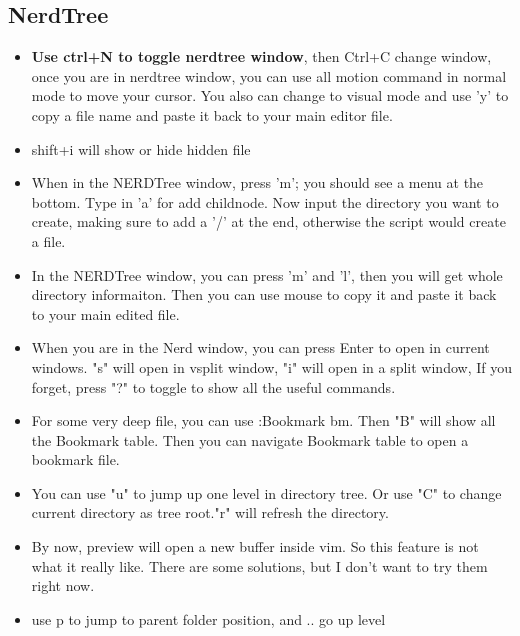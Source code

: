 \documentclass[a4paper,12pt,twoside]{book}
\begin{document}
\subsection{NerdTree}
\begin{itemize}
		
		\item \textbf{Use ctrl+N to toggle nerdtree window}, then Ctrl+C change window, once you are in nerdtree window, you can use all motion command in normal mode to move your cursor. You also can change to visual mode and use 'y' to copy a file name and paste it back to your main editor file.  

		\item shift+i will show or hide hidden file
		\item When in the NERDTree window, press 'm'; you should see a menu at the bottom. Type in 'a' for add childnode. Now input the directory you want to create, making sure to add a '/' at the end, otherwise the script would create a file.
		\item In the NERDTree window, you can press 'm' and 'l', then you will get whole directory informaiton. Then you can use mouse to copy it and paste it back to your main edited file.
		\item When you are in the Nerd window, you can press Enter to open in current windows. "s" will open in vsplit window, "i" will open in a split window, If you forget, press "?" to toggle to show all the useful commands.

		\item For some very deep file, you can use :Bookmark bm. Then "B" will show all the Bookmark table. Then you can navigate Bookmark table to open a bookmark file.
		\item You can use "u" to jump up one level in directory tree. Or use "C" to change current directory as tree root."r" will refresh the directory.
		\item By now, preview will open a new buffer inside vim. So this feature is not what it really like. There are some solutions, but I don't want to try them right now.

		\item use p to jump to parent folder position, and .. go up level
\end{itemize}
\end{document}
